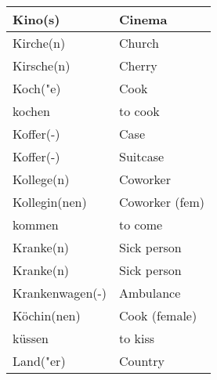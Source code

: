 \documentclass{article}
\begin{document}
\begin{minipage}{0.48\textwidth}
\begin{tabular}{|>{\raggedright\arraybackslash}p{3.5cm}|>{\raggedright\arraybackslash}p{3.5cm}|}
        Kino(s) & Cinema \\\hline
        Kirche(n) & Church \\\hline
        Kirsche(n) & Cherry \\\hline
        Koch("e) & Cook \\\hline
        kochen & to cook \\\hline
        Koffer(-) & Case \\\hline
        Koffer(-) & Suitcase \\\hline
        Kollege(n) & Coworker \\\hline
        Kollegin(nen) & Coworker (fem) \\\hline
        kommen & to come \\\hline
        Kranke(n) & Sick person \\\hline
        Kranke(n) & Sick person \\\hline
        Krankenwagen(-) & Ambulance \\\hline
        Köchin(nen) & Cook (female) \\\hline
        küssen & to kiss \\\hline
        Land("er) & Country \\\hline
    \end{tabular}
\end{minipage}

\newpage
\end{document}
